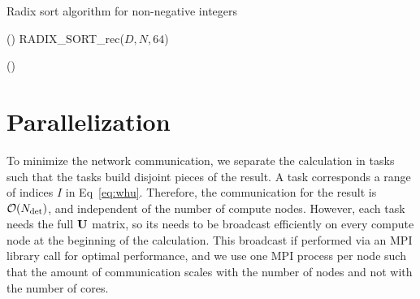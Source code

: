 \documentclass[./thesis.tex]{subfiles}
\begin{document}
\begin{algorithm}
\caption{Radix sort algorithm for non-negative integers}
\label{alg:radix}
\Fn(){}{
 RADIX\_SORT\_rec($D,N,64$) \;
}

\Fn(){}{

}
\end{algorithm}




\section{Parallelization}

To minimize the network communication, we separate the calculation in tasks
such that the tasks build disjoint pieces of the result. A task corresponds a
range of indices $I$ in Eq~\eqref{eq:whu}. Therefore, the communication for the
result is $\order{\Ndet}$, and independent of the number of compute nodes.
However, each task needs the full $\mathbf{U}$ matrix, so its needs to be
broadcast efficiently on every compute node at the beginning of the
calculation. This broadcast if performed via an MPI library call for optimal
performance,\cite{MPI} and we use one MPI process per node such that the amount of
communication scales with the number of nodes and not with the number of cores.
\end{document}
